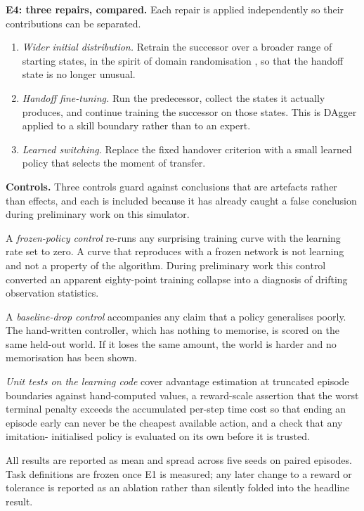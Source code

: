 \documentclass[11pt]{article}
\begin{document}
\textbf{E4: three repairs, compared.} Each repair is applied independently so their
contributions can be separated.

\begin{enumerate}
\itemsep0.15em
\item \emph{Wider initial distribution.} Retrain the successor over a broader range of
starting states, in the spirit of domain randomisation \cite{tobin2017}, so that the
handoff state is no longer unusual.
\item \emph{Handoff fine-tuning.} Run the predecessor, collect the states it actually
produces, and continue training the successor on those states. This is DAgger
\cite{ross2011} applied to a skill boundary rather than to an expert.
\item \emph{Learned switching.} Replace the fixed handover criterion with a small
learned policy that selects the moment of transfer.
\end{enumerate}

\textbf{Controls.} Three controls guard against conclusions that are artefacts rather
than effects, and each is included because it has already caught a false conclusion
during preliminary work on this simulator.

A \emph{frozen-policy control} re-runs any surprising training curve with the learning
rate set to zero. A curve that reproduces with a frozen network is not learning and not
a property of the algorithm. During preliminary work this control converted an apparent
eighty-point training collapse into a diagnosis of drifting observation statistics.

A \emph{baseline-drop control} accompanies any claim that a policy generalises poorly.
The hand-written controller, which has nothing to memorise, is scored on the same
held-out world. If it loses the same amount, the world is harder and no memorisation
has been shown.

\emph{Unit tests on the learning code} cover advantage estimation at truncated episode
boundaries against hand-computed values, a reward-scale assertion that the worst
terminal penalty exceeds the accumulated per-step time cost so that ending an episode
early can never be the cheapest available action, and a check that any imitation-
initialised policy is evaluated on its own before it is trusted.

All results are reported as mean and spread across five seeds on paired episodes. Task
definitions are frozen once E1 is measured; any later change to a reward or tolerance
is reported as an ablation rather than silently folded into the headline result.
\end{document}
